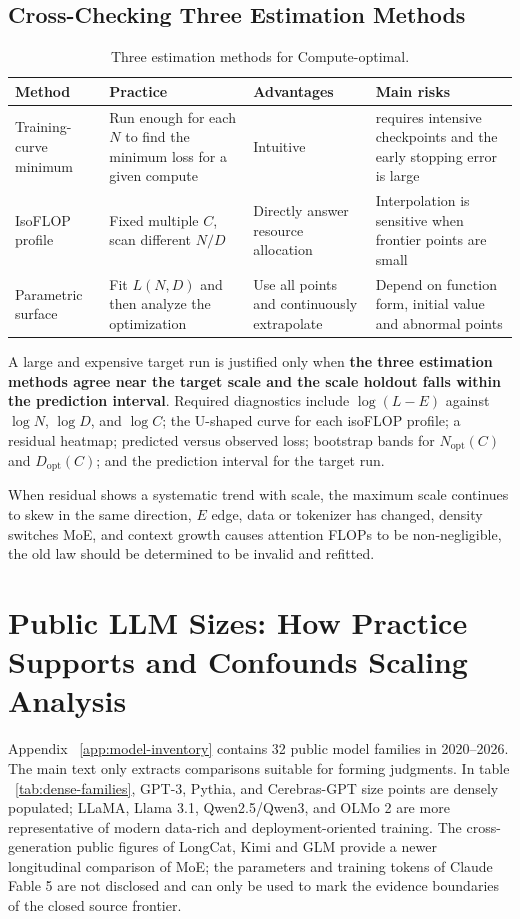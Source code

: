 \documentclass[UTF8,10pt,a4paper,fontset=none]{ctexart}
\begin{document}
\subsection{Cross-Checking Three Estimation Methods}

\begin{table}[htbp]
\centering
\caption{Three estimation methods for Compute-optimal.}
\label{tab:fit-methods}
\begin{tabularx}{\textwidth}{Y Y Y Y}
\toprule
Method & Practice & Advantages & Main risks \\
\midrule
Training-curve minimum & Run enough for each $N$ to find the minimum loss for a given compute & Intuitive & requires intensive checkpoints and the early stopping error is large \\
IsoFLOP profile & Fixed multiple $C$, scan different $N/D$ & Directly answer resource allocation & Interpolation is sensitive when frontier points are small \\
Parametric surface & Fit $L(N,D)$ and then analyze the optimization & Use all points and continuously extrapolate & Depend on function form, initial value and abnormal points \\
\bottomrule
\end{tabularx}
\end{table}

A large and expensive target run is justified only when \textbf{the three estimation methods agree near the target scale and the scale holdout falls within the prediction interval}. Required diagnostics include $\log(L-E)$ against $\log N$, $\log D$, and $\log C$; the U-shaped curve for each isoFLOP profile; a residual heatmap; predicted versus observed loss; bootstrap bands for $N_{\mathrm{opt}}(C)$ and $D_{\mathrm{opt}}(C)$; and the prediction interval for the target run.

When residual shows a systematic trend with scale, the maximum scale continues to skew in the same direction, $E$ edge, data or tokenizer has changed, density switches MoE, and context growth causes attention FLOPs to be non-negligible, the old law should be determined to be invalid and refitted.

\section{Public LLM Sizes: How Practice Supports and Confounds Scaling Analysis}

Appendix ~\ref{app:model-inventory} contains 32 public model families in 2020--2026. The main text only extracts comparisons suitable for forming judgments. In table ~\ref{tab:dense-families}, GPT-3, Pythia, and Cerebras-GPT size points are densely populated; LLaMA, Llama 3.1, Qwen2.5/Qwen3, and OLMo 2 are more representative of modern data-rich and deployment-oriented training. The cross-generation public figures of LongCat, Kimi and GLM provide a newer longitudinal comparison of MoE; the parameters and training tokens of Claude Fable 5 are not disclosed and can only be used to mark the evidence boundaries of the closed source frontier.
\end{document}
